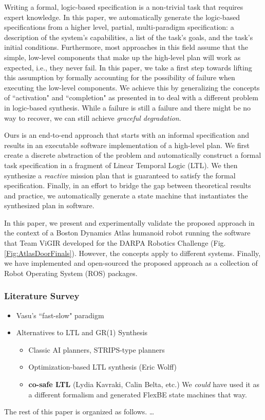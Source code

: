 Writing a formal, logic-based specification is a non-trivial task that requires expert knowledge.
In this paper, we automatically generate the logic-based specifications from a higher level, partial, multi-paradigm specification: a description of the system's capabilities, a list of the task's goals, and the task's initial conditions.
Furthermore, most approaches in this field assume that the simple, low-level components that make up the high-level plan will work as expected, i.e., they never fail.
In this paper, we take a first step towards lifting this assumption by formally accounting for the possibility of failure when executing the low-level components.
We achieve this by generalizing the concepts of ``activation" and ``completion" as presented in \cite{Vasu2013ICRA} to deal with a different problem in logic-based synthesis.
While a failure is still a failure and there might be no way to recover, we can still achieve \emph{graceful degradation}.

Ours is an end-to-end approach that starts with an informal specification and results in an executable software implementation of a high-level plan.
We first create a discrete abstraction of the problem and automatically construct a formal task specification in a fragment of Linear Temporal Logic (\textsc{LTL}).
We then synthesize a \emph{reactive} mission plan that is guaranteed to satisfy the formal specification.
Finally, in an effort to bridge the gap between theoretical results and practice, we automatically generate a state machine that instantiates the synthesized plan in software.

In this paper, we present and experimentally validate the proposed approach in the context of a Boston Dynamics Atlas humanoid robot running the software that Team ViGIR developed for the DARPA Robotics Challenge (Fig. \ref{Fig:AtlasDoorFinals}).
However, the concepts apply to different systems.
Finally, we have implemented and open-sourced the proposed approach as a collection of Robot Operating System (ROS) packages.

\subsubsection*{Literature Survey}
\begin{itemize}
	\item Vasu's ``fast-slow" paradigm \cite{Vasu2013ICRA}
	\item Alternatives to LTL and GR(1) Synthesis
	\begin{itemize}
		\item Classic AI planners, STRIPS-type planners
		\item Optimization-based LTL synthesis (Eric Wolff)
		\item \textbf{co-safe LTL} (Lydia Kavraki, Calin Belta, etc.) We \emph{could} have used it as a different formalism and generated FlexBE state machines that way.
	\end{itemize}
\end{itemize}

The rest of this paper is organized as follows. \ldots

